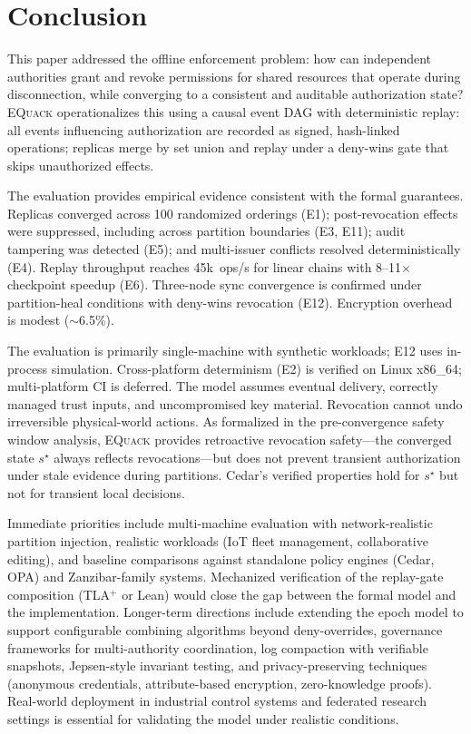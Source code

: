 \documentclass[10pt,journal,compsoc]{IEEEtran}
\newcommand{\equack}{\textsc{EQuack}}
\begin{document}
\section{Conclusion}
\label{sec:conclusion-paperC}

This paper addressed the offline enforcement problem: how can independent authorities grant and revoke permissions for shared resources that operate during disconnection, while converging to a consistent and auditable authorization state? \equack{} operationalizes this using a causal event DAG with deterministic replay: all events influencing authorization are recorded as signed, hash-linked operations; replicas merge by set union and replay under a deny-wins gate that skips unauthorized effects.

The evaluation provides empirical evidence consistent with the formal guarantees. Replicas converged across 100 randomized orderings (E1); post-revocation effects were suppressed, including across partition boundaries (E3, E11); audit tampering was detected (E5); and multi-issuer conflicts resolved deterministically (E4). Replay throughput reaches 45k~ops/s for linear chains with 8--11$\times$ checkpoint speedup (E6). Three-node sync convergence is confirmed under partition-heal conditions with deny-wins revocation (E12). Encryption overhead is modest ($\sim$6.5\%).

The evaluation is primarily single-machine with synthetic workloads; E12 uses in-process simulation. Cross-platform determinism (E2) is verified on Linux x86\_64; multi-platform CI is deferred. The model assumes eventual delivery, correctly managed trust inputs, and uncompromised key material. Revocation cannot undo irreversible physical-world actions. As formalized in the pre-convergence safety window analysis, \equack{} provides retroactive revocation safety---the converged state $s^\star$ always reflects revocations---but does not prevent transient authorization under stale evidence during partitions. Cedar's verified properties hold for $s^\star$ but not for transient local decisions.

Immediate priorities include multi-machine evaluation with network-realistic partition injection, realistic workloads (IoT fleet management, collaborative editing), and baseline comparisons against standalone policy engines (Cedar, OPA) and Zanzibar-family systems. Mechanized verification of the replay-gate composition (TLA$^+$ or Lean) would close the gap between the formal model and the implementation. Longer-term directions include extending the epoch model to support configurable combining algorithms beyond deny-overrides, governance frameworks for multi-authority coordination, log compaction with verifiable snapshots, Jepsen-style invariant testing, and privacy-preserving techniques (anonymous credentials, attribute-based encryption, zero-knowledge proofs). Real-world deployment in industrial control systems and federated research settings is essential for validating the model under realistic conditions.
\end{document}

